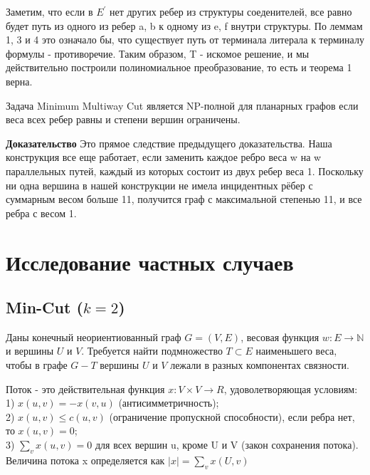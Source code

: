 Заметим, что если в \(E^'\) нет других ребер из структуры соеденителей, все равно будет путь из одного из ребер a, b к одному из e, f внутри структуры. По леммам 1, 3 и 4 это означало бы, что существует
путь от терминала литерала к терминалу формулы - противоречие. Таким образом, T - искомое решение, и мы действительно построили полиномиальное преобразование, то есть и теорема 1 верна.
\begin{theorem} Задача Minimum Multiway Cut является NP-полной для планарных графов если веса всех ребер равны и степени вершин ограничены.
\end{theorem}
\textbf{Доказательство} Это прямое следствие предыдущего доказательства. Наша конструкция все еще работает, если заменить каждое ребро веса w на w параллельных путей, каждый из которых состоит из двух ребер веса 1. Поскольку ни одна вершина в нашей конструкции не имела инцидентных рёбер с суммарным весом больше 11, получится граф с максимальной степенью 11, и все ребра с весом 1. 
\section{Исследование частных случаев}
\subsection{Min-Cut (\(k = 2\))}
Даны конечный неориентиованный граф \(G=(V,E)\), весовая функция \(w:E\rightarrow \mathbb{N}\) и вершины \(U\) и \(V\). Требуется найти подмножество \(T\subset E\) наименьшего веса, чтобы в графе \(G - T\) вершины \(U\) и \(V\) лежали в разных компонентах связности.
\\\begin{definition}
Поток - это действительная функция \(x:V\times V \rightarrow R\), удоволетворяющая условиям:
\\1) \(x(u,v)= -x(v,u)\) (антисимметричность);
\\2) \(x(u,v)\leq c(u,v)\) (ограничение пропускной способности), если ребра нет, то \(x(u,v)=0\);
\\3) \(\sum_v x(u,v)=0\) для всех вершин u, кроме U и V (закон сохранения потока).
Величина потока x определяется как \(|x|=\sum_v x(U,v)\)
\end{definition}

